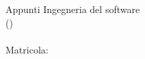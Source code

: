 \documentclass[a4paper]{article}
\def\header#1#2#3#4{
\vspace*{\fill}
  \begin{center}
    { \Large Appunti Ingegneria del software #1}\\ \vspace{10pt}
    {(\ANNO #2)} \\  \vspace{10pt}
{\Large \STUDENT#3} \\  \vspace{10pt}
{\Large Matricola: \MATRICOLA #4} \\  \vspace{10pt}
  \end{center}
  \vspace*{\fill}
}
\begin{document}
\header{}{}{}{}

\pagebreak

	\renewcommand{\contentsname}{Contenuti}
	\renewcommand\tablename{new}
	\tableofcontents \pagebreak

\vspace{30pt}








\end{document}
